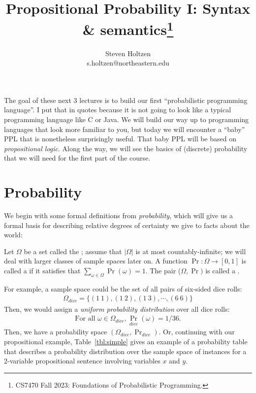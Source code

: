 \documentclass{tufte-handout}
\title{Propositional Probability I: Syntax \& semantics\thanks{CS7470 Fall 2023: Foundations of Probabilistic Programming.}}
\author[]{Steven Holtzen\\s.holtzen@northeastern.edu}
\begin{document}
\maketitle%


The goal of these next 3 lectures is to build our first ``probabilistic programming
language''. I put that in quotes because it is not going to look like a typical
programming language like C or Java. We will build our way up to programming
languages that look more familiar to you, but today we will encounter a ``baby''
PPL that is nonetheless surprisingly useful. That baby PPL will be based on
\emph{propositional logic}. Along the way, we will see the basics of
(discrete) probability that we will need for the first part of the course.

\section{Probability}
We begin with some formal definitions from \emph{probability}, which will give us a formal basis 
for describing relative degrees of certainty we give to facts about the world:
\begin{definition}
    Let $\Omega$ be a set called the ; assume that $|\Omega|$ is at most 
    countably-infinite; we will deal with larger classes of sample spaces later on.
    A function $\Pr : \Omega \rightarrow [0,1]$ is called a  
    if it satisfies that $\sum_{\omega \in \Omega} \Pr(\omega) = 1$.
    The pair ($\Omega, \Pr)$ is called a .
\end{definition}

For example, a sample space could be the set of all pairs of six-sided dice rolls:
\begin{align*}
    \Omega_{dice} = \{ (1~1), (1~2), (1~3), \cdots, (6~6)\}
\end{align*}
Then, we would assign a \emph{uniform probability distribution} over all dice
rolls:
\begin{align*}
    \text{For all } \omega \in \Omega_{dice}, {\Pr}_{dice}(\omega) = 1/36.
\end{align*}
Then, we have a probability space $(\Omega_{dice}, \Pr_{dice})$.
Or, continuing with our propositional example,
Table~\ref{tbl:simple} gives an example of a probability table that describes a
probability distribution over the sample space of instances for a 2-variable
propositional sentence involving variables $x$ and $y$.
\end{document}

